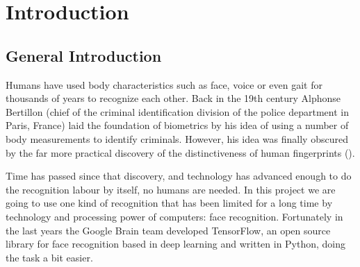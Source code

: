 \chapter{Introduction}
\label{introduction}



\section{General Introduction}
Humans have used body characteristics such as face, voice or even gait for thousands of years to recognize each other. Back in the 19th century Alphonse Bertillon (chief of the criminal identification division of the police department in Paris, France) laid the foundation of biometrics by his idea of using a number of body measurements to identify criminals. However, his idea was finally obscured by the far more practical discovery of the distinctiveness of human fingerprints (\cite{jain_biometrics}).

Time has passed since that discovery, and technology has advanced enough to do the recognition labour by itself, no humans are needed. In this project we are going to use one kind of recognition that has been limited for a long time by technology and processing power of computers: face recognition. Fortunately in the last years the Google Brain team developed TensorFlow, an open source library for face recognition based in deep learning and written in Python, doing the task a bit easier. 

